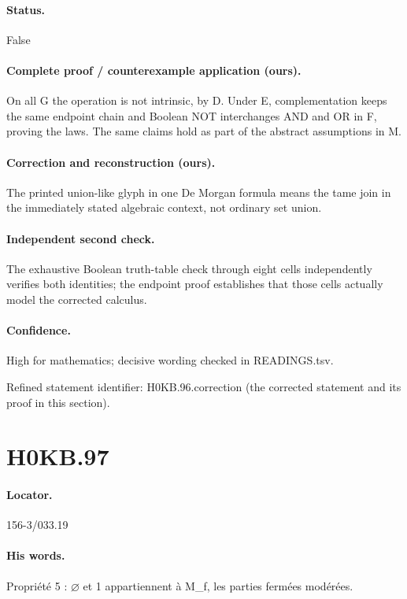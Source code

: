 \paragraph{Status.} False

\paragraph{Complete proof / counterexample application (ours).} On all G the operation is not intrinsic, by D. Under E, complementation keeps the same endpoint chain and Boolean NOT interchanges AND and OR in F, proving the laws. The same claims hold as part of the abstract assumptions in M.

\paragraph{Correction and reconstruction (ours).} The printed union-like glyph in one De Morgan formula means the tame join in the immediately stated algebraic context, not ordinary set union.

\paragraph{Independent second check.} The exhaustive Boolean truth-table check through eight cells independently verifies both identities; the endpoint proof establishes that those cells actually model the corrected calculus.

\paragraph{Confidence.} High for mathematics; decisive wording checked in READINGS.tsv.

\noindent Refined statement identifier: H0KB.96.correction (the corrected statement and its proof in this section).

\section*{H0KB.97}\label{statement:H0KB.97}
\paragraph{Locator.} 156-3/033.19

\paragraph{His words.} Propriété 5 : \ensuremath{\varnothing} et 1 appartiennent à M\_f, les parties fermées modérées.

